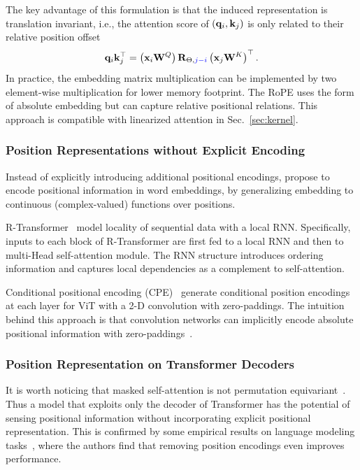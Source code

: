 \documentclass[manuscript,acmsmall,screen,nonacm]{acmart}
\theoremstyle{definition}
\begin{document}
The key advantage of this formulation is that the induced representation is translation invariant, i.e., the attention score of $(\mathbf{q}_i,\mathbf{k}_j)$ is only related to their relative position offset
\begin{equation}
    \bq_i\bk_j^\top=\left(\bx_i\bW^Q\right)\bR_{\Theta,\textcolor[rgb]{0,0,1}{j-i}}\left(\bx_j\bW^K\right)^\top.
\end{equation}
In practice, the embedding matrix multiplication can be implemented by two element-wise multiplication for lower memory footprint. The RoPE uses the form of absolute embedding but can capture relative positional relations. This approach is compatible with linearized attention in Sec.~\ref{sec:kernel}.

\subsubsection{Position Representations without Explicit Encoding}

Instead of explicitly introducing additional positional encodings, \citet{wang2020complex} propose to encode positional information in word embeddings, by generalizing embedding to continuous (complex-valued) functions over positions.

R-Transformer~\cite{wang19rxformer} model locality of sequential data with a local RNN. Specifically, inputs to each block of R-Transformer are first fed to a local RNN and then to multi-Head self-attention module. The RNN structure introduces ordering information and captures local dependencies as a complement to self-attention.

Conditional positional encoding (CPE)~\cite{chu2021conditional} generate conditional position encodings at each layer for ViT with a 2-D convolution with zero-paddings. The intuition behind this approach is that convolution networks can implicitly encode absolute positional information with zero-paddings~\cite{islam20cnnpos}.

\subsubsection{Position Representation on Transformer Decoders}

It is worth noticing that masked self-attention is not permutation equivariant~\cite{tsai-etal-2019-dissection}. Thus a model that exploits only the decoder of Transformer has the potential of sensing positional information without incorporating explicit positional representation. This is confirmed by some empirical results on language modeling tasks~\cite{IrieZSN19LM,schlag21fastweight}, where the authors find that removing position encodings even improves performance.
\end{document}
